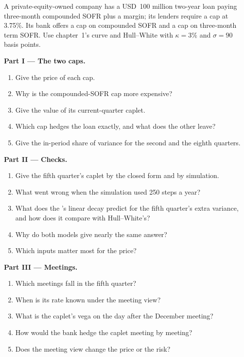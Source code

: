 \begin{problem}\label{pb:rc:modelling-overnight-rate-products:1}
A private-equity-owned company has a USD~100 million two-year loan paying three-month
compounded SOFR plus a margin; its lenders require a cap at 3.75\%. Its bank offers a
cap on compounded SOFR and a cap on three-month term SOFR. Use chapter~1's curve and
Hull--White with $\kappa=3\%$ and $\sigma=90$ basis points.

\medskip\noindent\textbf{Part I --- The two caps.}
\begin{enumerate}
\item Give the price of each cap.
\item Why is the compounded-SOFR cap more expensive?
\item Give the value of its current-quarter caplet.
\item Which cap hedges the loan exactly, and what does the other leave?
\item Give the in-period share of variance for the second and the eighth quarters.
\end{enumerate}

\medskip\noindent\textbf{Part II --- Checks.}
\begin{enumerate}[resume]
\item Give the fifth quarter's caplet by the closed form and by simulation.
\item What went wrong when the simulation used 250 steps a year?
\item What does the 's linear decay predict for the
fifth quarter's extra variance, and how does it compare with Hull--White's?
\item Why do both models give nearly the same answer?
\item Which inputs matter most for the price?
\end{enumerate}

\medskip\noindent\textbf{Part III --- Meetings.}
\begin{enumerate}[resume]
\item Which meetings fall in the fifth quarter?
\item When is its rate known under the meeting view?
\item What is the caplet's vega on the day after the December meeting?
\item How would the bank hedge the caplet meeting by meeting?
\item Does the meeting view change the price or the risk?
\end{enumerate}


\end{problem}
